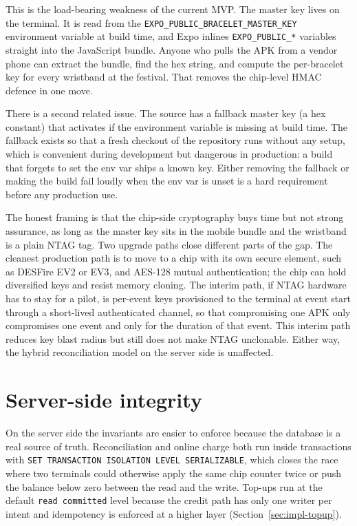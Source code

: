This is the load-bearing weakness of the current MVP. The master key lives on the terminal. It is read from the \texttt{EXPO\_PUBLIC\_BRACELET\_MASTER\_KEY} environment variable at build time, and Expo inlines \texttt{EXPO\_PUBLIC\_*} variables straight into the JavaScript bundle. Anyone who pulls the APK from a vendor phone can extract the bundle, find the hex string, and compute the per-bracelet key for every wristband at the festival. That removes the chip-level HMAC defence in one move.

There is a second related issue. The source has a fallback master key (a hex constant) that activates if the environment variable is missing at build time. The fallback exists so that a fresh checkout of the repository runs without any setup, which is convenient during development but dangerous in production: a build that forgets to set the env var ships a known key. Either removing the fallback or making the build fail loudly when the env var is unset is a hard requirement before any production use.

The honest framing is that the chip-side cryptography buys time but not strong assurance, as long as the master key sits in the mobile bundle and the wristband is a plain NTAG tag. Two upgrade paths close different parts of the gap. The cleanest production path is to move to a chip with its own secure element, such as DESFire EV2 or EV3, and AES-128 mutual authentication; the chip can hold diversified keys and resist memory cloning. The interim path, if NTAG hardware has to stay for a pilot, is per-event keys provisioned to the terminal at event start through a short-lived authenticated channel, so that compromising one APK only compromises one event and only for the duration of that event. This interim path reduces key blast radius but still does not make NTAG unclonable. Either way, the hybrid reconciliation model on the server side is unaffected.

\section{Server-side integrity}
\label{sec:server-integrity}

On the server side the invariants are easier to enforce because the database is a real source of truth. Reconciliation and online charge both run inside transactions with \texttt{SET TRANSACTION ISOLATION LEVEL SERIALIZABLE}, which closes the race where two terminals could otherwise apply the same chip counter twice or push the balance below zero between the read and the write. Top-ups run at the default \texttt{read committed} level because the credit path has only one writer per intent and idempotency is enforced at a higher layer (Section~\ref{sec:impl-topup}).

